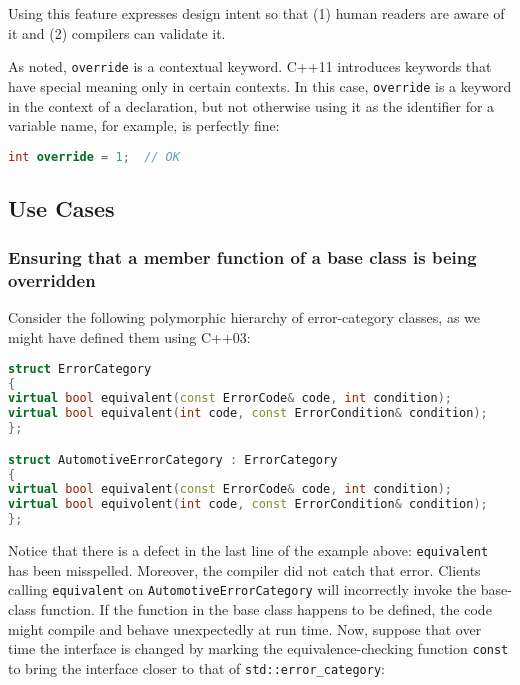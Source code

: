 \noindent Using this feature expresses design intent so that (1) human readers
are aware of it and (2) compilers can validate it.

As noted, \lstinline!override! is a contextual keyword. C++11 introduces keywords that have special meaning only in certain contexts.   In this case, \lstinline!override! is a keyword in the context of a declaration, but not otherwise using it as the identifier for a variable name, for example, is perfectly fine:

\begin{lstlisting}[language=C++]
int override = 1;  // OK
\end{lstlisting}

\subsection[Use Cases]{Use Cases}\label{use-cases}

\subsubsection[Ensuring that a member function of a base class is being overridden]{Ensuring that a member function of a base class is being overridden}\label{ensuring-that-a-member-function-of-a-base-class-is-being-overridden}

Consider the following polymorphic hierarchy of error-category classes, as we might have defined them using C++03:

\begin{lstlisting}[language=C++]
struct ErrorCategory
{
virtual bool equivalent(const ErrorCode& code, int condition);
virtual bool equivalent(int code, const ErrorCondition& condition);
};

struct AutomotiveErrorCategory : ErrorCategory
{
virtual bool equivalent(const ErrorCode& code, int condition);
virtual bool equivolent(int code, const ErrorCondition& condition);
};
\end{lstlisting}

\noindent Notice that there is a defect in the last line of the example above:
\lstinline!equivalent! has been misspelled. Moreover, the compiler did not
catch that error. Clients calling \lstinline!equivalent! on
\lstinline!AutomotiveErrorCategory! will incorrectly invoke the base-class
function. If the function in the base class happens to be defined, the
code might compile and behave unexpectedly at run time. Now, suppose
that over time the interface is changed by marking the
equivalence-checking function \lstinline!const! to bring the interface
closer to that of \lstinline!std::error_category!:

